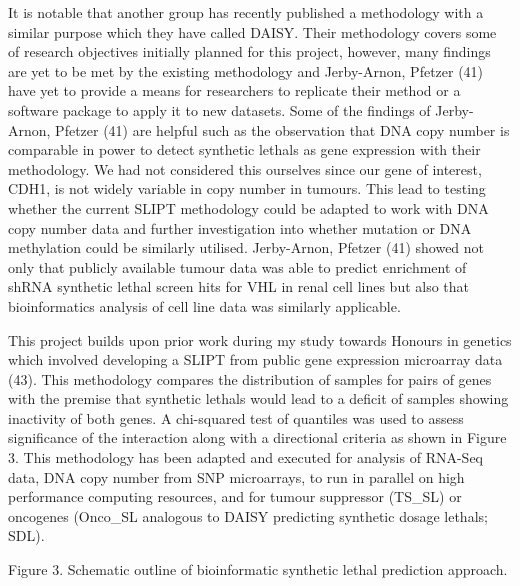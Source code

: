 It is notable that another group has recently published a methodology with a similar purpose which they have called \acrfull{DAISY}. Their methodology covers some of research objectives initially planned for this project, however, many findings are yet to be met by the existing methodology and Jerby-Arnon, Pfetzer (41) have yet to provide a means for researchers to replicate their method or a software package to apply it to new datasets. Some of the findings of Jerby-Arnon, Pfetzer (41) are helpful such as the observation that \acrshort{DNA} copy number is comparable in power to detect \glspl{synthetic lethal} as \gls{gene expression} with their methodology. We had not considered this ourselves since our gene of interest, CDH1, is not widely variable in copy number in \glspl{tumour}. This lead to testing whether the current \gls{SLIPT} methodology could be adapted to work with \acrshort{DNA} copy number data and further investigation into whether  \gls{mutation} or \acrshort{DNA} methylation could be similarly utilised. Jerby-Arnon, Pfetzer (41) showed not only that publicly available tumour data was able to predict enrichment of \gls{shRNA} \gls{synthetic lethal} screen hits for VHL in renal cell lines but also that \gls{bioinformatics} analysis of cell line data was similarly applicable.

This project builds upon prior work during my study towards Honours in genetics which involved developing a \gls{SLIPT} from public \gls{gene expression} \gls{microarray} data (43). This methodology compares the distribution of samples for pairs of genes with the premise that \glspl{synthetic lethal} would lead to a deficit of samples showing inactivity of both genes. A chi-squared test of quantiles was used to assess significance of the interaction along with a directional criteria as shown in Figure 3. This methodology has been adapted and executed for analysis of \gls{RNA-Seq}  data, \acrshort{DNA} copy number from \gls{SNP} \glspl{microarray}, to run in parallel on high performance computing resources, and for \gls{tumour suppressor} (TS\_SL) or \glspl{oncogene} (Onco\_SL analogous to \gls{DAISY} predicting \glspl{synthetic dosage lethal}; SDL).

Figure 3. Schematic outline of bioinformatic \gls{synthetic lethal} prediction approach.


